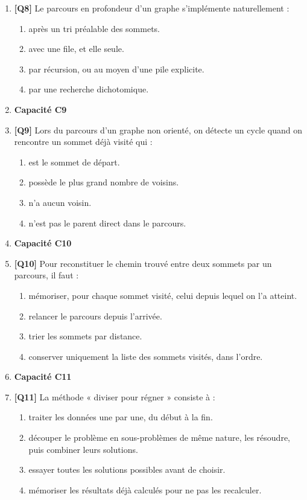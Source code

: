 \begin{enumerate}
\item \textbf{[Q8]} Le parcours en profondeur d'un graphe s'implémente naturellement :
  \begin{enumerate}[label=\Alph*.]
    \item après un tri préalable des sommets.
    \item avec une file, et elle seule.
    \item par récursion, ou au moyen d'une pile explicite.
    \item par une recherche dichotomique.
  \end{enumerate}

\item[] \textbf{Capacité C9}

\item \textbf{[Q9]} Lors du parcours d'un graphe non orienté, on détecte un cycle quand on rencontre un sommet déjà visité qui :
  \begin{enumerate}[label=\Alph*.]
    \item est le sommet de départ.
    \item possède le plus grand nombre de voisins.
    \item n'a aucun voisin.
    \item n'est pas le parent direct dans le parcours.
  \end{enumerate}

\item[] \textbf{Capacité C10}

\item \textbf{[Q10]} Pour reconstituer le chemin trouvé entre deux sommets par un parcours, il faut :
  \begin{enumerate}[label=\Alph*.]
    \item mémoriser, pour chaque sommet visité, celui depuis lequel on l'a atteint.
    \item relancer le parcours depuis l'arrivée.
    \item trier les sommets par distance.
    \item conserver uniquement la liste des sommets visités, dans l'ordre.
  \end{enumerate}

\item[] \textbf{Capacité C11}

\item \textbf{[Q11]} La méthode « diviser pour régner » consiste à :
  \begin{enumerate}[label=\Alph*.]
    \item traiter les données une par une, du début à la fin.
    \item découper le problème en sous-problèmes de même nature, les résoudre, puis combiner leurs solutions.
    \item essayer toutes les solutions possibles avant de choisir.
    \item mémoriser les résultats déjà calculés pour ne pas les recalculer.
  \end{enumerate}


\end{enumerate}
